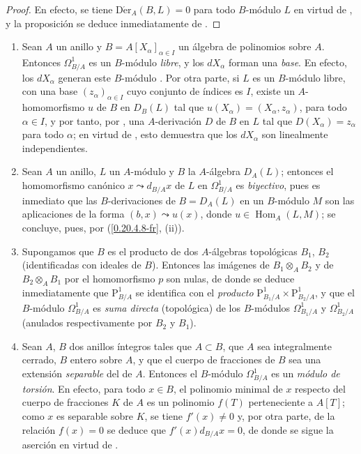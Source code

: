\begin{proof}
En efecto, se tiene $\operatorname{D\acute{e}r}_A(B,L)=0$ para todo $B$-módulo
$L$ en virtud de , y la proposición se deduce inmediatamente
de .
\end{proof}

\begin{examples}[20.4.13]
\label{0.20.4.13-fr}
\begin{enumerate}
  \item[\rm(i)] Sean $A$ un anillo y
  $B=A[X_\alpha]_{\alpha\in I}$ un álgebra de polinomios sobre $A$. Entonces
  $\Omega^1_{B/A}$ es un $B$-módulo \emph{libre}, y los $dX_\alpha$ forman una
  \emph{base}. En efecto, los $dX_\alpha$ generan este $B$-módulo
  . Por otra parte, si $L$ es un $B$-módulo libre, con
  una base $(z_\alpha)_{\alpha\in I}$ cuyo conjunto de índices es $I$, existe
  un $A$-homomorfismo $u$ de $B$ en $D_B(L)$ tal que
  $u(X_\alpha)=(X_\alpha,z_\alpha)$, para todo $\alpha\in I$, y por tanto, por
  , una $A$-derivación $D$ de $B$ en $L$ tal que
  $D(X_\alpha)=z_\alpha$ para todo $\alpha$; en virtud de
  , esto demuestra que los $dX_\alpha$ son linealmente
  independientes.
  \item[\rm(ii)] Sean $A$ un anillo, $L$ un $A$-módulo y $B$ la
  $A$-álgebra $D_A(L)$; entonces el homomorfismo canónico
  $x\leadsto d_{B/A}x$ de $L$ en $\Omega^1_{B/A}$ es \emph{biyectivo}, pues
  es inmediato que las $B$-derivaciones de $B=D_A(L)$ en un $B$-módulo
  $M$ son las aplicaciones de la forma $(b,x)\leadsto u(x)$, donde
  $u\in\operatorname{Hom}_A(L,M)$; se concluye, pues, por
  (\ref{0.20.4.8-fr}, (ii)).
  \item[\rm(iii)] Supongamos que $B$ es el producto de dos $A$-álgebras
  topológicas $B_1$, $B_2$ (identificadas con ideales de $B$). Entonces las
  imágenes de $B_1\otimes_A B_2$ y de $B_2\otimes_A B_1$ por el homomorfismo
  $p$  son nulas, de donde se deduce inmediatamente que
  $\mathrm{P}^1_{B/A}$ se identifica con el \emph{producto}
  $\mathrm{P}^1_{B_1/A}\times\mathrm{P}^1_{B_2/A}$, y que el $B$-módulo
  $\Omega^1_{B/A}$ es \emph{suma directa} (topológica) de los $B$-módulos
  $\Omega^1_{B_1/A}$ y $\Omega^1_{B_2/A}$ (anulados respectivamente por
  $B_2$ y $B_1$).
  \item[\rm(iv)] Sean $A$, $B$ dos anillos íntegros tales que $A\subset
  B$, que $A$ sea integralmente cerrado, $B$ entero sobre $A$, y que el cuerpo
  de fracciones de $B$ sea una extensión \emph{separable} del de $A$. Entonces
  el $B$-módulo $\Omega^1_{B/A}$ es un \emph{módulo de torsión}. En efecto,
  para todo $x\in B$, el polinomio minimal de $x$ respecto del cuerpo de
  fracciones $K$ de $A$ es un polinomio $f(T)$ perteneciente a $A[T]$; como
  $x$ es separable sobre $K$, se tiene $f'(x)\neq0$ y, por otra parte, de
  la relación $f(x)=0$ se deduce que $f'(x)d_{B/A}x=0$, de donde se sigue
  la aserción en virtud de .
\end{enumerate}
\end{examples}


